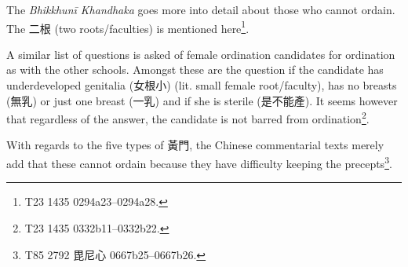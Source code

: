 The {\em Bhikkhunī Khandhaka} goes more into detail about those who cannot ordain. The 二根 (two roots/faculties) is mentioned here\footnote{T23 1435 0294a23–0294a28.}. 

A similar list of questions is asked of female ordination candidates for ordination as with the other schools. Amongst these are the question if the candidate has underdeveloped genitalia (女根小) (lit. small female root/faculty), has no breasts (無乳) or just one breast (一乳) and if she is sterile (是不能產). It seems however that regardless of the answer, the candidate is not barred from ordination\footnote{T23 1435 0332b11–0332b22.}.

With regards to the five types of 黃門, the Chinese commentarial texts merely add that these cannot ordain because they have difficulty keeping the precepts\footnote{T85 2792 毘尼心 0667b25–0667b26.}.

